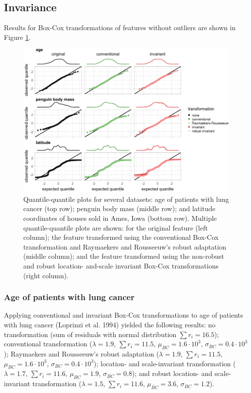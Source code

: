\documentclass[preprint,12pt,authoryear]{elsarticle}
\begin{document}
\subsection{Invariance}\label{invariance}

Results for Box-Cox transformations of features without outliers are
shown in Figure \ref{fig:experimental-results-invariance-appendix}.

\begin{figure}

{\centering \includegraphics{figure_appendix_2} 

}

\caption{Quantile-quantile plots for several datasets: age of patients with lung cancer (top row); penguin body mass (middle row); and latitude coordinates of houses sold in Ames, Iowa (bottom row). Multiple quantile-quantile plots are shown: for the original feature (left column); the feature transformed using the conventional Box-Cox transformation and Raymaekers and Rousseeuw's robust adaptation (middle column); and the feature transformed using the non-robust and robust location- and-scale invariant Box-Cox transformations (right column).}\label{fig:experimental-results-invariance-appendix}
\end{figure}

\subsubsection{Age of patients with lung
cancer}\label{age-of-patients-with-lung-cancer}

Applying conventional and invariant Box-Cox transformations to age of
patients with lung cancer (Loprinzi et al. 1994) yielded the following
results: no transformation (sum of residuals with normal distribution
\(\sum r_i = 16.5\)); conventional transformation (\(\lambda = 1.9\),
\(\sum r_i = 11.5\), \(\mu_{BC} = 1.6 \cdot 10^3\),
\(\sigma_{BC} = 0.4 \cdot 10^3\)); Raymaekers and Rousseeuw's robust
adaptation (\(\lambda = 1.9\), \(\sum r_i = 11.5\),
\(\mu_{BC} = 1.6 \cdot 10^3\), \(\sigma_{BC} = 0.4 \cdot 10^3\));
location- and scale-invariant transformation (\(\lambda = 1.7\),
\(\sum r_i = 11.6\), \(\mu_{BC} = 1.9\), \(\sigma_{BC} = 0.8\)); and
robust location- and scale-invariant transformation (\(\lambda = 1.5\),
\(\sum r_i = 11.6\), \(\mu_{BC} = 3.6\), \(\sigma_{BC} = 1.2\)).
\end{document}
